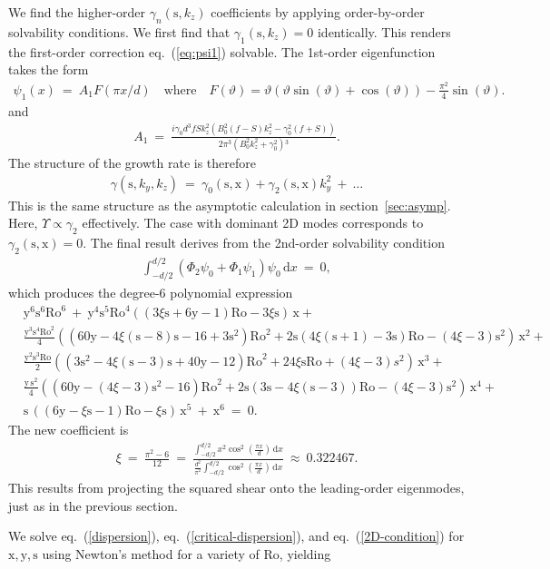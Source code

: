\documentclass{rsproca_new}%
\newcommand\Beq{\begin{eqnarray}}
\newcommand\Eeq{\end{eqnarray}}
\newcommand{\eq}[1]{eq.~(\ref{#1})}
\newcommand{\Ro}{\mathrm{Ro}}
\newcommand{\s}{\text{s}}
\newcommand{\x}{\text{x}}
\newcommand{\y}{\text{y}}
\newcommand{\dd}[1]{\,\mathrm{d}{#1}}
\begin{document}
We find the higher-order $\gamma_{n}(\s,k_{z})$ coefficients by applying order-by-order solvability conditions. We first find that $\gamma_{1}(\s, k_{z}) = 0$ identically. This renders the first-order correction \eq{eq:psi1} solvable. The 1st-order eigenfunction takes the form 
\Beq
\psi_{1}(x) \ = \ A_{1} F(\pi x/d) \quad \text{where} \quad  F(\vartheta) = \vartheta (\vartheta \sin (\vartheta)+\cos (\vartheta))-\frac{\pi^{2}}{4} \sin (\vartheta).
\Eeq
and
\Beq
A_{1} \ = \ \frac{i \gamma _0 d^3 f S k_z^2 \left(B_0^2 (f-S) k_z^2-\gamma _0^2
   (f+S)\right)}{2 \pi ^3 \left(B_0^2 k_z^2+\gamma _0^2\right){}^{\!3}}.
\Eeq
The structure of the growth rate is therefore 
\Beq
\gamma(\s,k_{y},k_{z}) \ = \ \gamma_{0}(\s,\x) + \gamma_{2}(\s,\x) k_{y}^{2} \ + \ \ldots 
\Eeq
This is the same structure as the asymptotic calculation in section~\ref{sec:asymp}. Here, $\Upsilon \propto \gamma_{2}$ effectively. The case with dominant 2D modes corresponds to $\gamma_{2}(\s,\x)=0$.  The final result derives from the 2nd-order solvability condition 
\Beq
\int_{-d/2}^{d/2} ( \Phi_{2} \psi_{0} + \Phi_{1} \psi_{1} ) \psi_{0} \dd{x}  \ = \ 0,
\Eeq
which produces the degree-6 polynomial expression  
\Beq
& \y^{6} \s^6\Ro^6  \ + \
 \y^4 \s^5 \Ro^4   \left( (3 \xi  \s+6 \y-1)\Ro -3 \xi  \s \right) \, \x +
  \nonumber \\  
& \frac{ \y^3 \s^4 \Ro^2  }{4}  \left( (60 \y -4 \xi  (\s-8) \s -16 + 3 \s^2)\Ro^{2} + 2 \s (4 \xi  (\s+1)-3 \s) \Ro - (4 \xi -3 ) \s^2 \right) \, \x^{2} + \nonumber \\ 
& \frac{\y^2  \s^3 \Ro }{2}  \left( (3 \s^2-4 \xi  (\s-3) \s+40 \y-12) \Ro^{2} + 24 \xi \s \Ro + (4 \xi -3) s^2 \right) \, \x^{3} + 
\nonumber \\ 
&  \frac{\y \,\s^2}{4} \left( (60 \y -(4 \xi -3) \s^2 - 16)\Ro^{2} + 2\s(3 \s-4 \xi  (\s-3)) \Ro - (4 \xi -3) \s^2 \right)\, \x^{4} +\nonumber \\ 
 &  \s\, (( 6 \y -\xi  \s-1) \Ro- \xi  \s) \, \x^{5}  \ + \   
   \x^{6} \ = \ 0.
   \label{2D-condition}
\Eeq
The new coefficient is
\Beq
\xi \ = \ \frac{\pi^{2}-6}{12} \ = \ \frac{\int_{-d/2}^{d/2} x^2 \cos ^2\left(\frac{\pi  x}{d}\right) \dd{x}}{\frac{d^{2}}{\pi^{2}}\int_{-d/2}^{d/2}  \cos ^2\left(\frac{\pi  x}{d}\right) \dd{x}} \ \approx \ 0.322467.
\Eeq
This results from projecting the squared shear onto the leading-order eigenmodes, just as in the previous section. 

We solve \eq{dispersion}, \eq{critical-dispersion}, and  \eq{2D-condition} for $\x,\y,\s$ using Newton's method for a variety of $\Ro$, yielding
\end{document}
